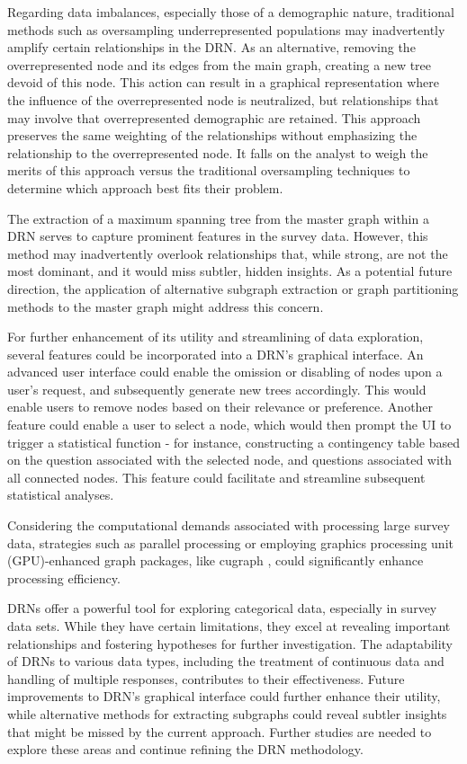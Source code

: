 Regarding data imbalances, especially those of a demographic nature, traditional methods such as oversampling underrepresented populations may inadvertently amplify certain relationships in the DRN. As an alternative, removing the overrepresented node and its edges from the main graph, creating a new tree devoid of this node. This action can result in a graphical representation where the influence of the overrepresented node is neutralized, but relationships that may involve that overrepresented demographic are retained. This approach preserves the same weighting of the relationships without emphasizing the relationship to the overrepresented node. It falls on the analyst to weigh the merits of this approach versus the traditional oversampling techniques to determine which approach best fits their problem.

The extraction of a maximum spanning tree from the master graph within a DRN serves to capture prominent features in the survey data. However, this method may inadvertently overlook relationships that, while strong, are not the most dominant, and it would miss subtler, hidden insights. As a potential future direction, the application of alternative subgraph extraction or graph partitioning methods to the master graph might address this concern.

For further enhancement of its utility and streamlining of data exploration, several features could be incorporated into a DRN's graphical interface. An advanced user interface could enable the omission or disabling of nodes upon a user's request, and subsequently generate new trees accordingly. This would enable users to remove nodes based on their relevance or preference.  Another feature could enable a user to select a node, which would then prompt the UI to trigger a statistical function - for instance, constructing a contingency table based on the question associated with the selected node, and questions associated with all connected nodes. This feature could facilitate and streamline subsequent statistical analyses.

Considering the computational demands associated with processing large survey data, strategies such as parallel processing or employing graphics processing unit (GPU)-enhanced graph packages, like cugraph \citep{cugraph}, could significantly enhance processing efficiency.

DRNs offer a powerful tool for exploring categorical data, especially in survey data sets. While they have certain limitations, they excel at revealing important relationships and fostering hypotheses for further investigation. The adaptability of DRNs to various data types, including the treatment of continuous data and handling of multiple responses, contributes to their effectiveness. Future improvements to DRN's graphical interface could further enhance their utility, while alternative methods for extracting subgraphs could reveal subtler insights that might be missed by the current approach. Further studies are needed to explore these areas and continue refining the DRN methodology.

